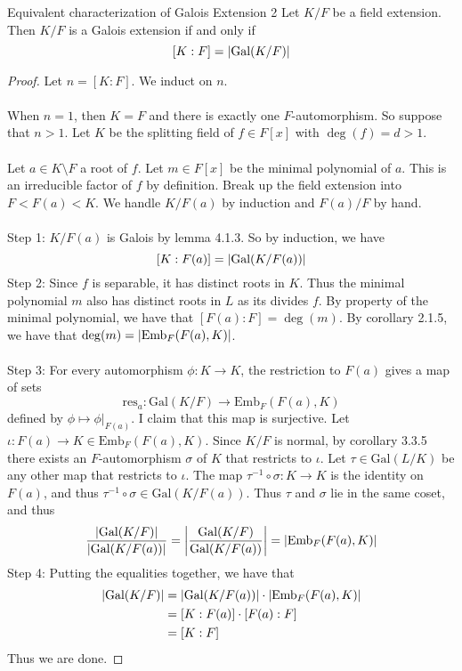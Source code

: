 \documentclass[a4paper]{article}
\begin{document}
\begin{thm}{Equivalent characterization of Galois Extension 2}{} Let $K/F$ be a field extension. Then $K/F$ is a Galois extension if and only if $$[K:F]=\abs{\text{Gal}(K/F)}$$ \tcbline
\begin{proof}
Let $n=[K:F]$. We induct on $n$. \\~\\
When $n=1$, then $K=F$ and there is exactly one $F$-automorphism. So suppose that $n>1$. Let $K$ be the splitting field of $f\in F[x]$ with $\deg(f)=d>1$. \\~\\
Let $a\in K\setminus F$ a root of $f$. Let $m\in F[x]$ be the minimal polynomial of $a$. This is an irreducible factor of $f$ by definition. Break up the field extension into $F<F(a)<K$. We handle $K/F(a)$ by induction and $F(a)/F$ by hand. \\~\\
Step 1: $K/F(a)$ is Galois by lemma 4.1.3. So by induction, we have $$[K:F(a)]=\abs{\text{Gal}(K/F(a))}$$
Step 2: Since $f$ is separable, it has distinct roots in $K$. Thus the minimal polynomial $m$ also has distinct roots in $L$ as its divides $f$. By property of the minimal polynomial, we have that $[F(a):F]=\deg(m)$. By corollary 2.1.5, we have that $\deg(m)=\abs{\text{Emb}_F(F(a),K)}$. \\~\\
Step 3: For every automorphism $\phi:K\to K$, the restriction to $F(a)$ gives a map of sets $$\text{res}_a:\text{Gal}(K/F)\to\text{Emb}_F(F(a),K)$$ defined by $\phi\mapsto\phi|_{F(a)}$. I claim that this map is surjective. Let $\iota:F(a)\to K\in\text{Emb}_F(F(a),K)$. Since $K/F$ is normal, by corollary 3.3.5 there exists an $F$-automorphism $\sigma$ of $K$ that restricts to $\iota$. Let $\tau\in\text{Gal}(L/K)$ be any other map that restricts to $\iota$. The map $\tau^{-1}\circ\sigma:K\to K$ is the identity on $F(a)$, and thus $\tau^{-1}\circ\sigma\in\text{Gal}(K/F(a))$. Thus $\tau$ and $\sigma$ lie in the same coset, and thus $$\frac{\abs{\text{Gal}(K/F)}}{\abs{\text{Gal}(K/F(a))}}=\abs{\frac{\text{Gal}(K/F)}{\text{Gal}(K/F(a))}}=\abs{\text{Emb}_F(F(a),K)}$$
Step 4: Putting the equalities together, we have that 
\begin{align*}
\abs{\text{Gal}(K/F)}&=\abs{\text{Gal}(K/F(a))}\cdot\abs{\text{Emb}_F(F(a),K)}\\
&=[K:F(a)]\cdot[F(a):F]\\
&=[K:F]
\end{align*}
Thus we are done. 
\end{proof}
\end{thm}
\end{document}
